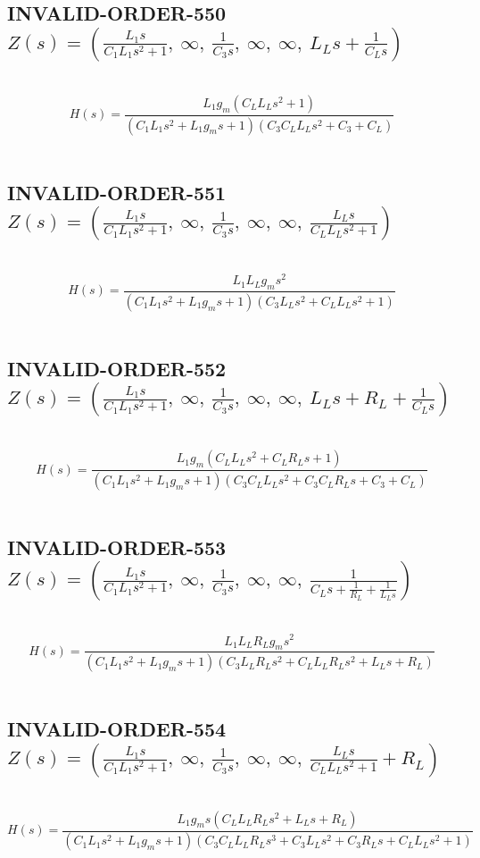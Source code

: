 \documentclass{article}
\begin{document}
\subsection{INVALID-ORDER-550 $Z(s) = \left( \frac{L_{1} s}{C_{1} L_{1} s^{2} + 1}, \  \infty, \  \frac{1}{C_{3} s}, \  \infty, \  \infty, \  L_{L} s + \frac{1}{C_{L} s}\right)$ } \ 
\textbf{\[H(s) = \frac{L_{1} g_{m} \left(C_{L} L_{L} s^{2} + 1\right)}{\left(C_{1} L_{1} s^{2} + L_{1} g_{m} s + 1\right) \left(C_{3} C_{L} L_{L} s^{2} + C_{3} + C_{L}\right)}\] } \ 
\subsection{INVALID-ORDER-551 $Z(s) = \left( \frac{L_{1} s}{C_{1} L_{1} s^{2} + 1}, \  \infty, \  \frac{1}{C_{3} s}, \  \infty, \  \infty, \  \frac{L_{L} s}{C_{L} L_{L} s^{2} + 1}\right)$ } \ 
\textbf{\[H(s) = \frac{L_{1} L_{L} g_{m} s^{2}}{\left(C_{1} L_{1} s^{2} + L_{1} g_{m} s + 1\right) \left(C_{3} L_{L} s^{2} + C_{L} L_{L} s^{2} + 1\right)}\] } \ 
\subsection{INVALID-ORDER-552 $Z(s) = \left( \frac{L_{1} s}{C_{1} L_{1} s^{2} + 1}, \  \infty, \  \frac{1}{C_{3} s}, \  \infty, \  \infty, \  L_{L} s + R_{L} + \frac{1}{C_{L} s}\right)$ } \ 
\textbf{\[H(s) = \frac{L_{1} g_{m} \left(C_{L} L_{L} s^{2} + C_{L} R_{L} s + 1\right)}{\left(C_{1} L_{1} s^{2} + L_{1} g_{m} s + 1\right) \left(C_{3} C_{L} L_{L} s^{2} + C_{3} C_{L} R_{L} s + C_{3} + C_{L}\right)}\] } \ 
\subsection{INVALID-ORDER-553 $Z(s) = \left( \frac{L_{1} s}{C_{1} L_{1} s^{2} + 1}, \  \infty, \  \frac{1}{C_{3} s}, \  \infty, \  \infty, \  \frac{1}{C_{L} s + \frac{1}{R_{L}} + \frac{1}{L_{L} s}}\right)$ } \ 
\textbf{\[H(s) = \frac{L_{1} L_{L} R_{L} g_{m} s^{2}}{\left(C_{1} L_{1} s^{2} + L_{1} g_{m} s + 1\right) \left(C_{3} L_{L} R_{L} s^{2} + C_{L} L_{L} R_{L} s^{2} + L_{L} s + R_{L}\right)}\] } \ 
\subsection{INVALID-ORDER-554 $Z(s) = \left( \frac{L_{1} s}{C_{1} L_{1} s^{2} + 1}, \  \infty, \  \frac{1}{C_{3} s}, \  \infty, \  \infty, \  \frac{L_{L} s}{C_{L} L_{L} s^{2} + 1} + R_{L}\right)$ } \ 
\textbf{\[H(s) = \frac{L_{1} g_{m} s \left(C_{L} L_{L} R_{L} s^{2} + L_{L} s + R_{L}\right)}{\left(C_{1} L_{1} s^{2} + L_{1} g_{m} s + 1\right) \left(C_{3} C_{L} L_{L} R_{L} s^{3} + C_{3} L_{L} s^{2} + C_{3} R_{L} s + C_{L} L_{L} s^{2} + 1\right)}\] } \ 
\end{document}
